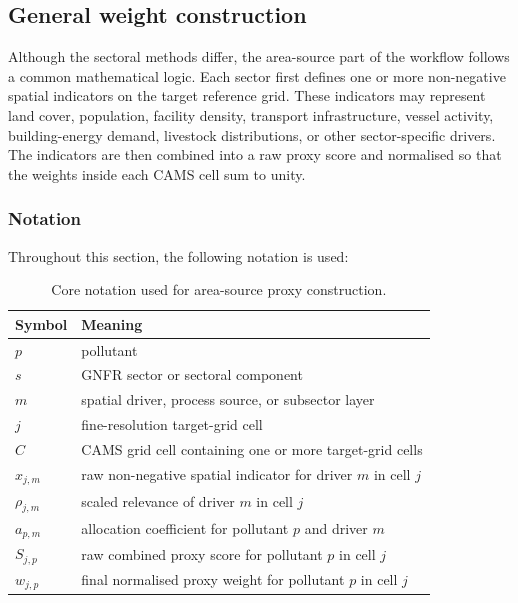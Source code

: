 \subsection{General weight construction}

Although the sectoral methods differ, the area-source part of the
workflow follows a common mathematical logic. Each sector first defines
one or more non-negative spatial indicators on the target reference
grid. These indicators may represent land cover, population, facility
density, transport infrastructure, vessel activity, building-energy
demand, livestock distributions, or other sector-specific drivers. The
indicators are then combined into a raw proxy score and normalised so
that the weights inside each CAMS cell sum to unity.

\subsubsection{Notation}

Throughout this section, the following notation is used:

\begin{table}[h]
  \centering
  \caption{Core notation used for area-source proxy construction.}
  \label{tab:proxy-notation}
  \begin{tabular}{ll}
    \toprule
    Symbol & Meaning \\
    \midrule
    $p$ & pollutant \\
    $s$ & GNFR sector or sectoral component \\
    $m$ & spatial driver, process source, or subsector layer \\
    $j$ & fine-resolution target-grid cell \\
    $C$ & CAMS grid cell containing one or more target-grid cells \\
    $x_{j,m}$ & raw non-negative spatial indicator for driver $m$ in cell $j$ \\
    $\rho_{j,m}$ & scaled relevance of driver $m$ in cell $j$ \\
    $a_{p,m}$ & allocation coefficient for pollutant $p$ and driver $m$ \\
    $S_{j,p}$ & raw combined proxy score for pollutant $p$ in cell $j$ \\
    $w_{j,p}$ & final normalised proxy weight for pollutant $p$ in cell $j$ \\
    \bottomrule
  \end{tabular}
\end{table}

